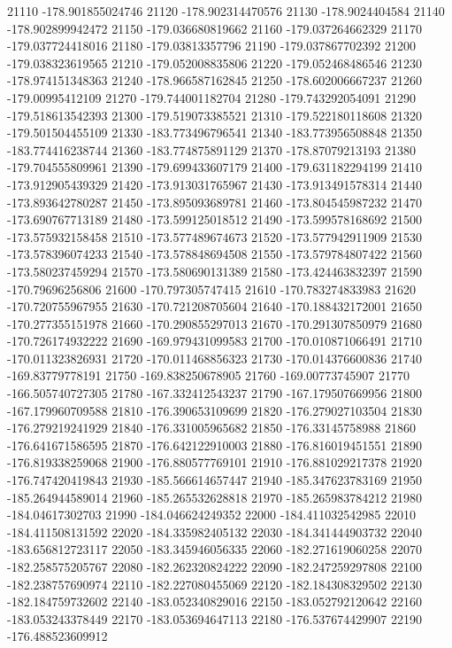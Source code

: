 {21110 -178.901855024746
21120 -178.902314470576
21130 -178.9024404584
21140 -178.902899942472
21150 -179.036680819662
21160 -179.037264662329
21170 -179.037724418016
21180 -179.03813357796
21190 -179.037867702392
21200 -179.038323619565
21210 -179.052008835806
21220 -179.052468486546
21230 -178.974151348363
21240 -178.966587162845
21250 -178.602006667237
21260 -179.00995412109
21270 -179.744001182704
21280 -179.743292054091
21290 -179.518613542393
21300 -179.519073385521
21310 -179.522180118608
21320 -179.501504455109
21330 -183.773496796541
21340 -183.773956508848
21350 -183.774416238744
21360 -183.774875891129
21370 -178.87079213193
21380 -179.704555809961
21390 -179.699433607179
21400 -179.631182294199
21410 -173.912905439329
21420 -173.913031765967
21430 -173.913491578314
21440 -173.893642780287
21450 -173.895093689781
21460 -173.804545987232
21470 -173.690767713189
21480 -173.599125018512
21490 -173.599578168692
21500 -173.575932158458
21510 -173.577489674673
21520 -173.577942911909
21530 -173.578396074233
21540 -173.578848694508
21550 -173.579784807422
21560 -173.580237459294
21570 -173.580690131389
21580 -173.424463832397
21590 -170.79696256806
21600 -170.797305747415
21610 -170.783274833983
21620 -170.720755967955
21630 -170.721208705604
21640 -170.188432172001
21650 -170.277355151978
21660 -170.290855297013
21670 -170.291307850979
21680 -170.726174932222
21690 -169.979431099583
21700 -170.010871066491
21710 -170.011323826931
21720 -170.011468856323
21730 -170.014376600836
21740 -169.83779778191
21750 -169.838250678905
21760 -169.00773745907
21770 -166.505740727305
21780 -167.332412543237
21790 -167.179507669956
21800 -167.179960709588
21810 -176.390653109699
21820 -176.279027103504
21830 -176.279219241929
21840 -176.331005965682
21850 -176.33145758988
21860 -176.641671586595
21870 -176.642122910003
21880 -176.816019451551
21890 -176.819338259068
21900 -176.880577769101
21910 -176.881029217378
21920 -176.747420419843
21930 -185.566614657447
21940 -185.347623783169
21950 -185.264944589014
21960 -185.265532628818
21970 -185.265983784212
21980 -184.04617302703
21990 -184.046624249352
22000 -184.411032542985
22010 -184.411508131592
22020 -184.335982405132
22030 -184.341444903732
22040 -183.656812723117
22050 -183.345946056335
22060 -182.271619060258
22070 -182.258575205767
22080 -182.262320824222
22090 -182.247259297808
22100 -182.238757690974
22110 -182.227080455069
22120 -182.184308329502
22130 -182.184759732602
22140 -183.052340829016
22150 -183.052792120642
22160 -183.053243378449
22170 -183.053694647113
22180 -176.537674429907
22190 -176.488523609912
}
